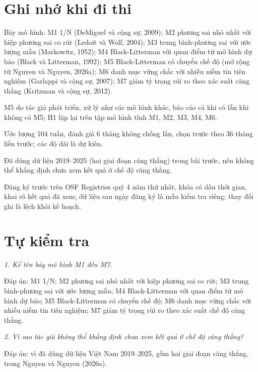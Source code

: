 \section{Ghi nhớ khi đi thi}

\begin{tcolorbox}[breakable]
Bảy mô hình: M1 1/N (DeMiguel và cộng sự, 2009); M2 phương sai nhỏ nhất với hiệp phương sai co rút (Ledoit và Wolf, 2004); M3 trung bình-phương sai với ước lượng mẫu (Markowitz, 1952); M4 Black-Litterman với quan điểm từ mô hình dự báo (Black và Litterman, 1992); M5 Black-Litterman có chuyển chế độ (mở rộng từ Nguyen và Nguyen, 2026a); M6 danh mục vững chắc với nhiều niềm tin tiên nghiệm (Garlappi và cộng sự, 2007); M7 giảm tỷ trọng rủi ro theo xác suất căng thẳng (Kritzman và cộng sự, 2012).

M5 do tác giả phát triển, xử lý như các mô hình khác, báo cáo cả khi có lẫn khi không có M5; H1 lặp lại trên tập mô hình tĩnh M1, M2, M3, M4, M6.

Ước lượng 104 tuần, đánh giá 6 tháng không chồng lấn, chọn trước theo 36 tháng liền trước; các độ dài là dự kiến.

Đã dùng dữ liệu 2019--2025 (hai giai đoạn căng thẳng) trong bài trước, nên không thể khẳng định chưa xem kết quả ở chế độ căng thẳng.

Đăng ký trước trên OSF Registries quý 4 năm thứ nhất, khóa có dấu thời gian, khai rõ kết quả đã xem; dữ liệu sau ngày đăng ký là mẫu kiểm tra riêng; thay đổi ghi là lệch khỏi kế hoạch.
\end{tcolorbox}

\section{Tự kiểm tra}

{\itshape 1. Kể tên bảy mô hình M1 đến M7.\par}

Đáp án: M1 1/N; M2 phương sai nhỏ nhất với hiệp phương sai co rút; M3 trung bình-phương sai với ước lượng mẫu; M4 Black-Litterman với quan điểm từ mô hình dự báo; M5 Black-Litterman có chuyển chế độ; M6 danh mục vững chắc với nhiều niềm tin tiên nghiệm; M7 giảm tỷ trọng rủi ro theo xác suất chế độ căng thẳng.

{\itshape 2. Vì sao tác giả không thể khẳng định chưa xem kết quả ở chế độ căng thẳng?\par}

Đáp án: vì đã dùng dữ liệu Việt Nam 2019--2025, gồm hai giai đoạn căng thẳng, trong Nguyen và Nguyen (2026a).

